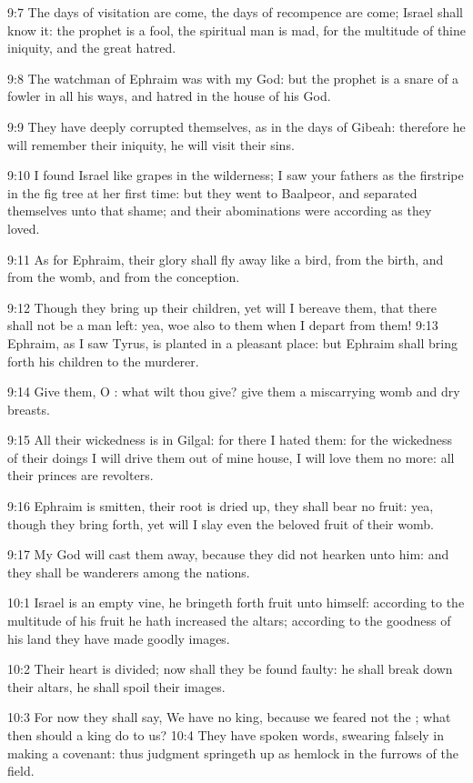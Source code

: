9:7 The days of visitation are come, the days of recompence are come;
Israel shall know it: the prophet is a fool, the spiritual man is mad,
for the multitude of thine iniquity, and the great hatred.

9:8 The watchman of Ephraim was with my God: but the prophet is a
snare of a fowler in all his ways, and hatred in the house of his God.

9:9 They have deeply corrupted themselves, as in the days of Gibeah:
therefore he will remember their iniquity, he will visit their sins.

9:10 I found Israel like grapes in the wilderness; I saw your fathers
as the firstripe in the fig tree at her first time: but they went to
Baalpeor, and separated themselves unto that shame; and their
abominations were according as they loved.

9:11 As for Ephraim, their glory shall fly away like a bird, from the
birth, and from the womb, and from the conception.

9:12 Though they bring up their children, yet will I bereave them,
that there shall not be a man left: yea, woe also to them when I
depart from them!  9:13 Ephraim, as I saw Tyrus, is planted in a
pleasant place: but Ephraim shall bring forth his children to the
murderer.

9:14 Give them, O \LORD: what wilt thou give? give them a miscarrying
womb and dry breasts.

9:15 All their wickedness is in Gilgal: for there I hated them: for
the wickedness of their doings I will drive them out of mine house, I
will love them no more: all their princes are revolters.

9:16 Ephraim is smitten, their root is dried up, they shall bear no
fruit: yea, though they bring forth, yet will I slay even the beloved
fruit of their womb.

9:17 My God will cast them away, because they did not hearken unto
him: and they shall be wanderers among the nations.

10:1 Israel is an empty vine, he bringeth forth fruit unto himself:
according to the multitude of his fruit he hath increased the altars;
according to the goodness of his land they have made goodly images.

10:2 Their heart is divided; now shall they be found faulty: he shall
break down their altars, he shall spoil their images.

10:3 For now they shall say, We have no king, because we feared not
the \LORD; what then should a king do to us?  10:4 They have spoken
words, swearing falsely in making a covenant: thus judgment springeth
up as hemlock in the furrows of the field.

